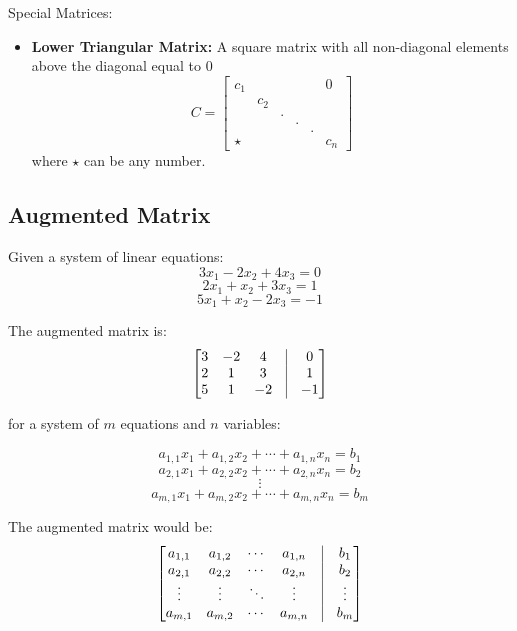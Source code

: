 \documentclass{article}
\begin{document}
\begin{paragraph}{Special Matrices:}
\begin{itemize}
    \item \textbf{Lower Triangular Matrix:} A square matrix with all non-diagonal elements above the diagonal equal to 0
        \[ C = \begin{bmatrix}
            c_1 &&&&& 0 \\
            &c_2&&&&\\
            &&.&&&\\
            &&&.&&\\
            &&&&.&\\
            \star&&&&&c_n
        \end{bmatrix}\]
        where $\star$ can be any number.
\end{itemize}
\end{paragraph}


\subsection*{Augmented Matrix}
Given a system of linear equations:
    \[
    3x_1 - 2x_2 + 4x_3 = 0
    \]
    \[
    2x_1 + x_2 + 3x_3 = 1
    \]
    \[
    5x_1 + x_2 - 2x_3 = -1
    \]
    
The augmented matrix is:
\[
\begin{bmatrix}
    3 & -2 & 4 & \vline & 0 \\
    2 & 1 & 3 & \vline & 1 \\
    5 & 1 & -2 & \vline & -1 
\end{bmatrix}
\]    

for a system of $m$ equations and $n$ variables:

    \[
    a_{1,1} x_1 + a_{1,2} x_2 + \cdots + a_{1,n} x_n = b_1
    \]
    \[
    a_{2,1} x_1 + a_{2,2} x_2 + \cdots + a_{2,n} x_n = b_2
    \]
    \[
    \vdots
    \]
    \[
    a_{m,1} x_1 + a_{m,2} x_2 + \cdots + a_{m,n} x_n = b_m
    \]

The augmented matrix would be:
\[
\begin{bmatrix}
    a_{1,1} & a_{1,2} & \cdots & a_{1,n} & \vline & b_1 \\
    a_{2,1} & a_{2,2} & \cdots & a_{2,n} & \vline & b_2 \\
    \vdots & \vdots & \ddots & \vdots & \vline & \vdots \\
    a_{m,1} & a_{m,2} & \cdots & a_{m,n} & \vline & b_m
\end{bmatrix}
\]
\end{document}
